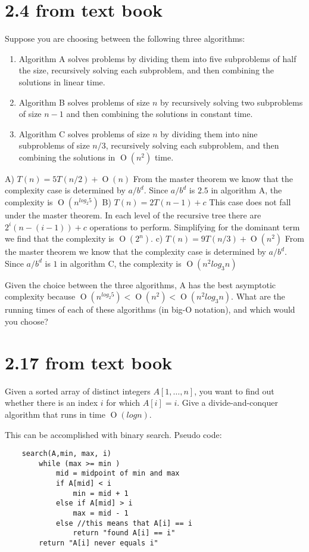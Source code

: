 \documentclass[12pt]{article}
\newcommand{\BigO}[1]{\ensuremath{\operatorname{O}\left(#1\right)}}
\begin{document}
\section*{2.4 from text book}
Suppose you are choosing between the following three algorithms:

\begin{enumerate}
\item Algorithm A solves problems by dividing them into five subproblems
of half the size, recursively solving each subproblem, and then
combining the solutions in linear time.

\item Algorithm B solves problems of size $n$ by recursively solving two
subproblems of size $n−1$ and then combining the solutions in constant
time.

\item Algorithm C solves problems of size $n$ by dividing them into nine
subproblems of size $n/3$, recursively solving each subproblem, and then
combining the solutions in $\BigO{n^2}$ time.
\end{enumerate}

A) $T(n) = 5T(n/2) + \BigO{n}$
	From the master theorem we know that the complexity case is determined by $a/b^{d}$.  Since $a/b^{d}$ is $2.5$ in algorithm A, the complexity is $\BigO{n^{log_2 5}}$
B) $T(n) = 2T(n-1) + c$
	This case does not fall under the master theorem.  In each level of the	recursive tree there are $2^{i}(n-(i-1)) +c$ operations to perform.  Simplifying for the dominant term we find that the complexity is $\BigO{2^{n}}$.
c) $T(n) = 9T(n/3) + \BigO{n^2}$
	From the master theorem we know that the complexity case is determined by $a/b^{d}$.  Since $a/b^{d}$ is $1$ in algorithm C, the complexity is $\BigO{n^{2}log_3 n}$

Given the choice between the three algorithms, A has the best asymptotic complexity because $\BigO{n^{log_2 5}} \lt \BigO{n^{2}} \lt \BigO{n^{2}log_3 n}$.
\noindent What are the running times of each of these algorithms (in big-O
notation), and which would you choose?

\section*{2.17 from text book}

Given a sorted array of distinct integers $A[1, \dots , n]$, you want to
find out whether there is an index $i$ for which $A[i] = i$. Give a
divide-and-conquer algorithm that runs in time $\BigO{log n}$.

This can be accomplished with binary search.
Pseudo code:
\begin{verbatim}
	search(A,min, max, i)
		while (max >= min )
			mid = midpoint of min and max
			if A[mid] < i
				min = mid + 1
			else if A[mid] > i
				max = mid - 1
			else //this means that A[i] == i
				return "found A[i] == i"
		return "A[i] never equals i"
\end{verbatim}
\end{document}
